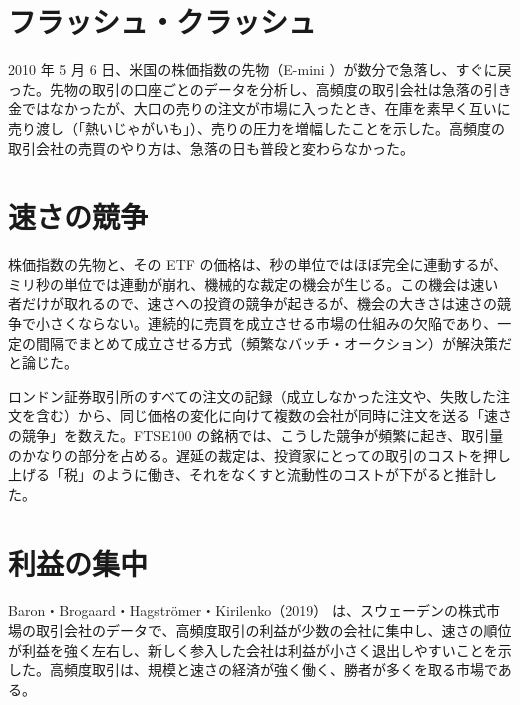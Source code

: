 \section{フラッシュ・クラッシュ}

\begin{paperbox}
2010 年 5 月 6 日、米国の株価指数の先物（E-mini \SP{}）が数分で急落し、すぐに戻った。先物の取引の口座ごとのデータを分析し、高頻度の取引会社は急落の引き金ではなかったが、大口の売りの注文が市場に入ったとき、在庫を素早く互いに売り渡し（「熱いじゃがいも」）、売りの圧力を増幅したことを示した。高頻度の取引会社の売買のやり方は、急落の日も普段と変わらなかった。
\end{paperbox}

\section{速さの競争}

\begin{paperbox}
株価指数の先物と、その ETF の価格は、秒の単位ではほぼ完全に連動するが、ミリ秒の単位では連動が崩れ、機械的な裁定の機会が生じる。この機会は速い者だけが取れるので、速さへの投資の競争が起きるが、機会の大きさは速さの競争で小さくならない。連続的に売買を成立させる市場の仕組みの欠陥であり、一定の間隔でまとめて成立させる方式（頻繁なバッチ・オークション）が解決策だと論じた。
\end{paperbox}

\begin{paperbox}
ロンドン証券取引所のすべての注文の記録（成立しなかった注文や、失敗した注文を含む）から、同じ価格の変化に向けて複数の会社が同時に注文を送る「速さの競争」を数えた。FTSE100 の銘柄では、こうした競争が頻繁に起き、取引量のかなりの部分を占める。遅延の裁定は、投資家にとっての取引のコストを押し上げる「税」のように働き、それをなくすと流動性のコストが下がると推計した。
\end{paperbox}

\section{利益の集中}

Baron・Brogaard・Hagströmer・Kirilenko（2019）\cite{bbhk2019} は、スウェーデンの株式市場の取引会社のデータで、高頻度取引の利益が少数の会社に集中し、速さの順位が利益を強く左右し、新しく参入した会社は利益が小さく退出しやすいことを示した。高頻度取引は、規模と速さの経済が強く働く、勝者が多くを取る市場である。

